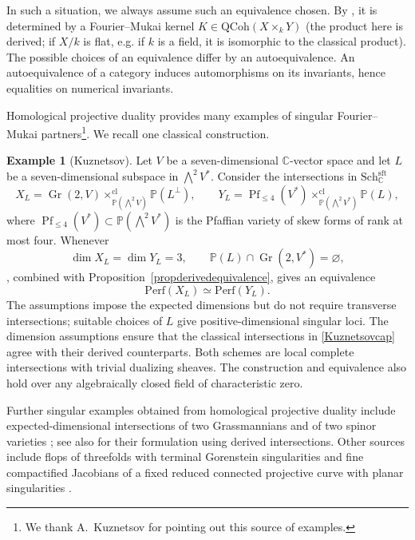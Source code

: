 \documentclass{amsart}
\theoremstyle{plain}
\theoremstyle{definition}
\newtheorem{example}[prop]{Example}
\newcommand{\bbC}{\mathbb{C}}
\newcommand{\Perf}{\mathrm{Perf}}
\newcommand{\bbP}{\mathbb{P}}
\newcommand{\QCoh}{\mathrm{QCoh}}
\newcommand{\Sch}{\mathrm{Sch}}
\DeclareMathOperator{\Gr}{Gr}
\newcommand{\cl}{\mathrm{cl}}
\newcommand{\sft}{\mathrm{sft}}
\begin{document}
In such a situation, we always assume such an equivalence chosen.
By \cite[Theorem~8.9 and Corollary~8.12]{Toe07}, it is determined by a Fourier--Mukai kernel
$K\in\QCoh(X\times_kY)$ (the product here is derived; if $X/k$ is flat, e.g. if $k$ is a field, it is isomorphic to the classical product).
The possible choices of an equivalence differ by an autoequivalence. An autoequivalence of a category induces automorphisms on its invariants, hence equalities on numerical invariants.

\medskip

Homological projective duality provides many examples of singular Fourier--Mukai partners\footnote{We thank A.~Kuznetsov for pointing out this source of examples.}. We recall one classical construction.

\begin{example}[Kuznetsov]\label{examplePfaffian}
Let $V$ be a seven-dimensional $\bbC$-vector space and let $L$ be a seven-dimensional subspace in $\bigwedge^2V^*$. Consider the intersections in $\Sch^\sft_\bbC$ 
\begin{equation}\label{Kuznetsovcap}
X_L=\Gr(2,V)\times^{\cl}_{\bbP(\bigwedge^2V)}\bbP(L^\perp),
\qquad
Y_L=\operatorname{Pf}_{\leq4}(V^*)\times^{\cl}_{\bbP(\bigwedge^2V^*)}\bbP(L),
\end{equation}
where $\operatorname{Pf}_{\leq4}(V^*)\subset
\bbP(\bigwedge^2V^*)$ is the Pfaffian variety of skew forms of rank at most four.
Whenever
\begin{equation}\label{Kuzdim}
\dim X_L=\dim Y_L=3,
\qquad
\bbP(L)\cap\Gr(2,V^*)=\varnothing,
\end{equation}
\cite[Theorem~11.4]{Kuz06}, combined with Proposition~\ref{propderivedequivalence}, gives an equivalence
\[
\Perf(X_L)\simeq\Perf(Y_L).
\]
The assumptions impose the expected dimensions but do not require transverse intersections; suitable choices of $L$ give positive-dimensional singular loci. The dimension assumptions ensure that the classical intersections in \eqref{Kuznetsovcap} agree with their derived counterparts. Both schemes are local complete intersections with trivial dualizing sheaves.
The construction and equivalence also hold over any algebraically closed field of characteristic zero.
\end{example}

Further singular examples obtained from homological projective duality include expected-dimensional intersections of two Grassmannians \cite[Theorem~1.1]{BCP20} and of two spinor varieties \cite[Proposition~4.2 and the subsequent remark]{Man19};
see also \cite[Theorems~6.1 and~6.3]{KP21} for their formulation using derived intersections.
Other sources include flops of threefolds with terminal Gorenstein singularities \cite[Theorem~1.1]{Che02} and fine compactified Jacobians of a fixed reduced connected projective curve with planar singularities \cite[Theorem~A]{MRV19}.
\end{document}
